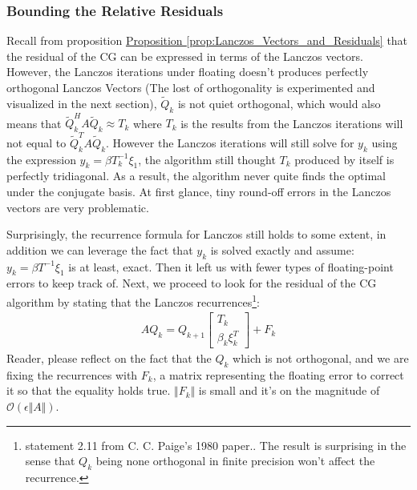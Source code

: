 \documentclass[]{article}
\theoremstyle{definition}
\begin{document}
        \subsubsection{Bounding the Relative Residuals}
            Recall from proposition \hyperref[prop:Lanczos_Vectors_and_Residuals]{Proposition \ref*{prop:Lanczos_Vectors_and_Residuals}} that the residual of the CG can be expressed in terms of the Lanczos vectors. However, the Lanczos iterations under floating doesn't produces perfectly orthogonal Lanczos Vectors (The lost of orthogonality is experimented and visualized in the next section), $\tilde{Q}_k$ is not quiet orthogonal, which would also means that $\tilde{Q}_k^HA\tilde{Q}_k\approx T_k$ where $T_k$ is the results from the Lanczos iterations will not equal to $\tilde{Q}^T_kA\tilde{Q}_k$. However the Lanczos iterations will still solve for $y_k$ using the expression $y_k = \beta T^{-1}_k\xi_1$, the algorithm still thought $T_k$ produced by itself is perfectly tridiagonal. As a result, the algorithm never quite finds the optimal under the conjugate basis. At first glance, tiny round-off errors in the Lanczos vectors are very problematic. 
            \par
            Surprisingly, the recurrence formula for Lanczos still holds to some extent, in addition we can leverage the fact that $y_k$ is solved exactly and assume: $y_k = \beta T^{-1}\xi_1$ is at least, exact. Then it left us with fewer types of floating-point errors to keep track of. Next, we proceed to look for the residual of the CG algorithm by stating that the Lanczos recurrences\footnote{statement 2.11 from C. C. Paige's 1980 paper.\cite{paper:paige1980}. The result is surprising in the sense that $Q_k$ being none orthogonal in finite precision won't affect the recurrence.}: 
            \begin{align}
                AQ_k = Q_{k + 1} \begin{bmatrix}
                    T_k
                    \\
                    \beta_k \xi_k^T
                \end{bmatrix} + F_k
            \end{align}
            Reader, please reflect on the fact that the $Q_k$ which is not orthogonal, and we are fixing the recurrences with $F_k$, a matrix representing the floating error to correct it so that the equality holds true. $\Vert F_k\Vert$ is small and it's on the magnitude of $\mathcal O(\epsilon \Vert A \Vert)$. 
\end{document}
